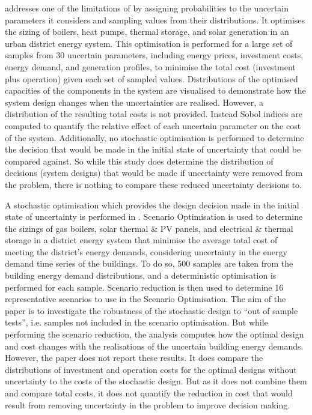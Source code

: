  addresses one of the limitations of  by assigning probabilities to the uncertain parameters it considers and sampling values from their distributions. It optimises the sizing of boilers, heat pumps, thermal storage, and solar generation in an urban district energy system. This optimisation is performed for a large set of samples from 30 uncertain parameters, including energy prices, investment costs, energy demand, and generation profiles, to minimise the total cost (investment plus operation) given each set of sampled values. Distributions of the optimised capacities of the components in the system are visualised to demonstrate how the system design changes when the uncertainties are realised. However, a distribution of the resulting total costs is not provided. Instead Sobol indices are computed to quantify the relative effect of each uncertain parameter on the cost of the system. Additionally, no stochastic optimisation is performed to determine the decision that would be made in the initial state of uncertainty that could be compared against. So while this study does determine the distribution of decisions (system designs) that would be made if uncertainty were removed from the problem, there is nothing to compare these reduced uncertainty decisions to.

A stochastic optimisation which provides the design decision made in the initial state of uncertainty is performed in . Scenario Optimisation is used to determine the sizings of gas boilers, solar thermal \& PV panels, and electrical \& thermal storage in a district energy system that minimise the average total cost of meeting the district's energy demands, considering uncertainty in the energy demand time series of the buildings. To do so, 500 samples are taken from the building energy demand distributions, and a deterministic optimisation is performed for each sample. Scenario reduction is then used to determine 16 representative scenarios to use in the Scenario Optimisation. The aim of the paper is to investigate the robustness of the stochastic design to ``out of sample tests'', i.e. samples not included in the scenario optimisation. But while performing the scenario reduction, the analysis computes how the optimal design and cost changes with the realisations of the uncertain building energy demands. However, the paper does not report these results. It does compare the distributions of investment and operation costs for the optimal designs without uncertainty to the costs of the stochastic design. But as it does not combine them and compare total costs, it does not quantify the reduction in cost that would result from removing uncertainty in the problem to improve decision making.

